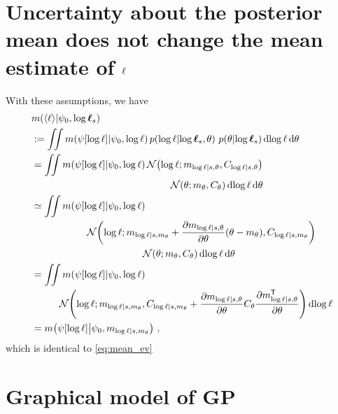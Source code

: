 \documentclass{article}
\begin{document}
\section{Uncertainty about the posterior mean does not change the mean estimate of $\lfn$}
With these assumptions, we have
\begin{align*}
& \mean{\inty{\lfn}}{\psi_0,\tvr_s} \\
& \deq \iint \mean{\psi[\tr]}{\psi_0,\tr}
\p{\tr}{\tvr_s, \theta}\, \p{\theta}{\tvr_s}\ud \tr\,\ud \theta\\
& = \iint \mean{\psi[\tr]}{\psi_0,\tr} \N{\tr}{m_{\tr|s,\theta}}{C_{\tr|s,\theta}}
\\
& \hspace{5cm}\N{\theta}{m_\theta}{C_\theta}\ud \tr\,\ud \theta
\\
& \simeq \iint \mean{\psi[\tr]}{\psi_0,\tr} 
\\
& \hspace{2cm}\N{\tr}
{m_{\tr|s,m_\theta}+\pderiv{m_{\tr|s,\theta}}{\theta}(\theta-m_\theta)}
{C_{\tr|s,m_\theta}}
\\
& \hspace{4cm}
\N{\theta}{m_\theta}{C_\theta}\ud \tr\,\ud \theta
\\
& = \iint \mean{\psi[\tr]}{\psi_0,\tr} \\
& \hspace{1cm}\N{\tr}
{m_{\tr|s,m_\theta}}
{C_{\tr|s,m_\theta}+\pderiv{m_{\tr|s,\theta}}{\theta}C_\theta\pderiv{m\tra_{\tr|s,\theta}}{\theta}}
\ud \tr
\\
& = \mean{\psi[\tr]}{\psi_0,m_{\tr|s,m_\theta}}\,,
\end{align*}
which is identical to \eqref{eq:mean_ev}

\section{Graphical model of GP}

\end{document}

